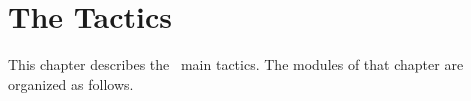 
\newpage
\section*{The Tactics}

\ocwsection \label{tactics}
This chapter describes the \Coq\ main tactics.
The modules of that chapter are organized as follows.

\bigskip
\begin{center}\end{center}

